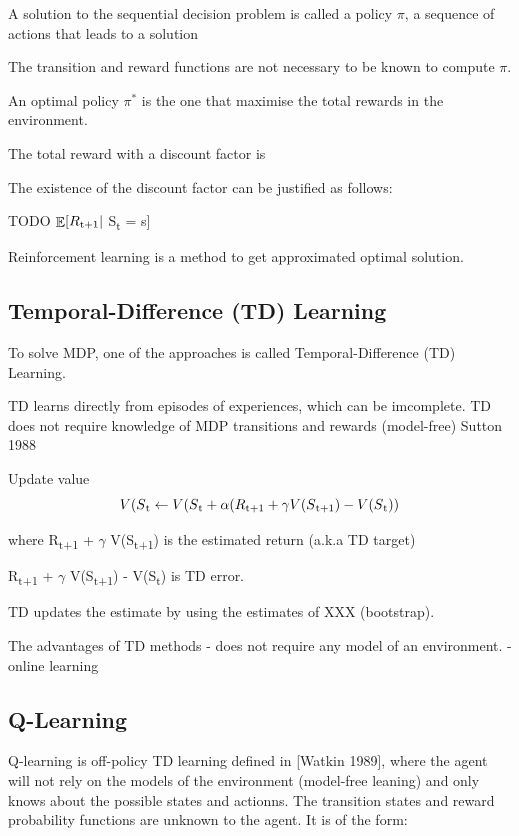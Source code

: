 \documentclass[12pt,twoside]{report}
\DeclareMathOperator{\E}{\mathbb{E}}
\begin{document}
A solution to the sequential decision problem is called a policy $\pi$, a sequence of actions that leads to a solution

The transition and reward functions are not necessary to be known to compute $\pi$.

An optimal policy $\pi^*$ is the one that maximise the total rewards in the environment.

The total reward with a discount factor is



The existence of the discount factor can be justified as follows:

TODO
$\displaystyle \E[R\textsubscript{t+1} \vert$ S\textsubscript{t} = s]


Reinforcement learning is a method to get approximated optimal solution.


\subsection{Temporal-Difference (TD) Learning}

To solve MDP, one of the approaches is called Temporal-Difference (TD) Learning.

TD learns directly from episodes of experiences, which can be imcomplete.
TD does not require knowledge of MDP transitions and rewards (model-free)
Sutton 1988

Update value
\begin{equation}
V(S\textsubscript{t} \leftarrow V(S\textsubscript{t} + \alpha (R\textsubscript{t+1} + \gamma V(S\textsubscript{t+1}) - V(S\textsubscript{t}))
\end{equation}

where R\textsubscript{t+1} + $\gamma$ V(S\textsubscript{t+1}) is the estimated return (a.k.a TD target)

R\textsubscript{t+1} + $\gamma$ V(S\textsubscript{t+1}) - V(S\textsubscript{t}) is TD error.

TD updates the estimate by using the estimates of XXX (bootstrap).

The advantages of TD methods
- does not require any model of an environment.
- online learning

\subsection{Q-Learning}

Q-learning is off-policy TD learning defined in [Watkin 1989], where the agent will not rely on the models of the environment (model-free leaning) and only knows about the possible states and actionns. The transition states and reward probability functions are unknown to the agent.
It is of the form:
\end{document}
